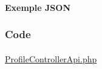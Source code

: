 	\newpage
		\paragraph{Exemple JSON}
			\paragraph{}
			
			
			
	\subsubsection{Code}
		\paragraph{}
			\href{https://github.com/victorsmits/Aquabike/blob/master/backend/src/Controller/API/ProfileControllerApi.php}{ProfileControllerApi.php}
